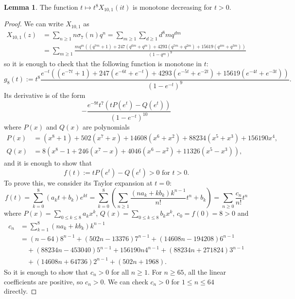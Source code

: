 \documentclass[10pt,reqno]{amsproc}
\newcommand{\1}{\mathds{1}}	%
\theoremstyle{definition}
\newtheorem{lemma}[theorem]{Lemma}
\theoremstyle{remark}
\begin{document}
\begin{lemma}
    \label{lem:X101weak}
    The function $t \mapsto t^{8} X_{10, 1}(it)$ is monotone decreasing for $t > 0$.
\end{lemma}
\begin{proof}
    We can write $X_{10, 1}$ as
    \begin{align*}
        X_{10, 1}(z) &= \sum_{n \ge 1} n \sigma_7(n) q^n = \sum_{m \ge 1} \sum_{d \ge 1} d^8 m q^{dm} \\
        &= \sum_{m \ge 1} \frac{m q^m ((q^{7m} + 1) + 247 (q^{6m} + q^{m}) + 4293 (q^{5m} + q^{2m}) + 15619 (q^{4m} + q^{3m}))}{(1 - q^m)^9}
    \end{align*}
    so it is enough to check that the following function is monotone in $t$:
    \[
    g_8(t) := t^8 \frac{e^{-t} ((e^{-7t} + 1) + 247 (e^{-6t} + e^{-t}) + 4293 (e^{-5t} + e^{-2t}) + 15619 (e^{-4t} + e^{-3t}))}{(1 - e^{-t})^9}.
    \]
    Its derivative is of the form
    \[
    -\frac{e^{-9t} t^7 (t P(e^t) - Q(e^t))}{(1 - e^{-t})^{10}}
    \]
    where $P(x)$ and $Q(x)$ are polynomials
    \begin{align*}
        P(x) &= (x^8 + 1) + 502 (x^7 + x) + 14608 (x^6 + x^2) + 88234 (x^5 + x^3) + 156190 x^4, \\
        Q(x) &= 8 (x^8 - 1 + 246 (x^7 - x) + 4046 (x^6 - x^2) + 11326 (x^5 - x^3)),
    \end{align*}
    and it is enough to show that
    \begin{equation}
        \label{eqn:fpos}
        f(t) := t P(e^t) - Q(e^t) > 0 \text{ for } t > 0.
    \end{equation}
    To prove this, we consider its Taylor expansion at $t = 0$:
    \[
    f(t) = \sum_{k=0}^{8} (a_k t + b_k) e^{kt} = \sum_{k = 0}^{8} \left(\sum_{n \ge 1} \frac{(na_k + kb_k)k^{n-1}}{n!} t^n + b_k\right)  = \sum_{n \ge 0} \frac{c_n}{n!} t^n
    \]
    where $P(x) = \sum_{0 \le k \le 8} a_k x^k$, $Q(x) = \sum_{0 \le k \le 8} b_k x^k$, $c_0 = f(0) = 8 > 0$ and
    \begin{align*}
    c_n &= \sum_{k=1}^{8} (na_k + kb_k) k^{n-1} \\
    &= (n - 64) 8^{n-1} + (502n - 13376) 7^{n-1} + (14608 n - 194208) 6^{n-1} \\
    &\quad + (88234 n - 453040) 5^{n-1} + 156190 n 4^{n-1} + (88234n + 271824) 3^{n-1}  \\
    &\quad + (14608 n + 64736) 2^{n-1} + (502 n + 1968).
    \end{align*}
    So it is enough to show that $c_n > 0$ for all $n \ge 1$.
    For $n \ge 65$, all the linear coefficients are positive, so $c_n > 0$.
    We can check $c_n > 0$ for $1 \le n \le 64$ directly.
\end{proof}
\end{document}
